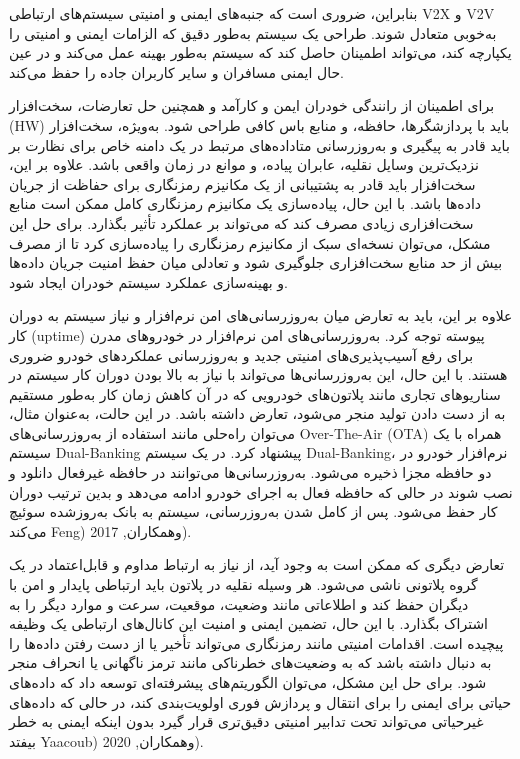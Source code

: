 \documentclass[a4paper,10pt]{article}
\begin{document}
            بنابراین، ضروری است که جنبه‌های ایمنی و امنیتی سیستم‌های ارتباطی V2X و V2V به‌خوبی متعادل شوند. طراحی یک سیستم به‌طور دقیق که الزامات ایمنی و امنیتی را یکپارچه کند، می‌تواند اطمینان حاصل کند که سیستم به‌طور بهینه عمل می‌کند و در عین حال ایمنی مسافران و سایر کاربران جاده را حفظ می‌کند.

            برای اطمینان از رانندگی خودران ایمن و کارآمد و همچنین حل تعارضات، سخت‌افزار (HW) باید با پردازشگرها، حافظه، و منابع باس کافی طراحی شود. به‌ویژه، سخت‌افزار باید قادر به پیگیری و به‌روزرسانی متاداده‌های مرتبط در یک دامنه خاص برای نظارت بر نزدیک‌ترین وسایل نقلیه، عابران پیاده، و موانع در زمان واقعی باشد. علاوه بر این، سخت‌افزار باید قادر به پشتیبانی از یک مکانیزم رمزنگاری برای حفاظت از جریان داده‌ها باشد. با این حال، پیاده‌سازی یک مکانیزم رمزنگاری کامل ممکن است منابع سخت‌افزاری زیادی مصرف کند که می‌تواند بر عملکرد تأثیر بگذارد. برای حل این مشکل، می‌توان نسخه‌ای سبک از مکانیزم رمزنگاری را پیاده‌سازی کرد تا از مصرف بیش از حد منابع سخت‌افزاری جلوگیری شود و تعادلی میان حفظ امنیت جریان داده‌ها و بهینه‌سازی عملکرد سیستم خودران ایجاد شود.

            علاوه بر این، باید به تعارض میان به‌روزرسانی‌های امن نرم‌افزار و نیاز سیستم به دوران کار (uptime) پیوسته توجه کرد. به‌روزرسانی‌های امن نرم‌افزار در خودروهای مدرن برای رفع آسیب‌پذیری‌های امنیتی جدید و به‌روزرسانی عملکردهای خودرو ضروری هستند. با این حال، این به‌روزرسانی‌ها می‌تواند با نیاز به بالا بودن دوران کار سیستم در سناریوهای تجاری مانند پلاتون‌های خودرویی که در آن کاهش زمان کار به‌طور مستقیم به از دست دادن تولید منجر می‌شود، تعارض داشته باشد. در این حالت، به‌عنوان مثال، می‌توان راه‌حلی مانند استفاده از به‌روزرسانی‌های Over-The-Air (OTA) همراه با یک سیستم Dual-Banking پیشنهاد کرد. در یک سیستم Dual-Banking، نرم‌افزار خودرو در دو حافظه مجزا ذخیره می‌شود. به‌روزرسانی‌ها می‌توانند در حافظه غیرفعال دانلود و نصب شوند در حالی که حافظه فعال به اجرای خودرو ادامه می‌دهد و بدین ترتیب دوران کار حفظ می‌شود. پس از کامل شدن به‌روزرسانی، سیستم به بانک به‌روزشده سوئیچ می‌کند Feng) وهمکاران, 2017).

            تعارض دیگری که ممکن است به وجود آید، از نیاز به ارتباط مداوم و قابل‌اعتماد در یک گروه پلاتونی ناشی می‌شود. هر وسیله نقلیه در پلاتون باید ارتباطی پایدار و امن با دیگران حفظ کند و اطلاعاتی مانند وضعیت، موقعیت، سرعت و موارد دیگر را به اشتراک بگذارد. با این حال، تضمین ایمنی و امنیت این کانال‌های ارتباطی یک وظیفه پیچیده است. اقدامات امنیتی مانند رمزنگاری می‌تواند تأخیر یا از دست رفتن داده‌ها را به دنبال داشته باشد که به وضعیت‌های خطرناکی مانند ترمز ناگهانی یا انحراف منجر شود. برای حل این مشکل، می‌توان الگوریتم‌های پیشرفته‌ای توسعه داد که داده‌های حیاتی برای ایمنی را برای انتقال و پردازش فوری اولویت‌بندی کند، در حالی که داده‌های غیرحیاتی می‌تواند تحت تدابیر امنیتی دقیق‌تری قرار گیرد بدون اینکه ایمنی به خطر بیفتد Yaacoub) وهمکاران, 2020).
\end{document}
